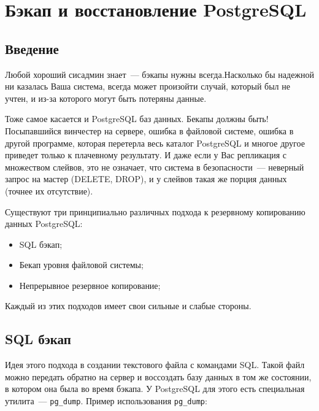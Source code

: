 \chapter{Бэкап и восстановление PostgreSQL}

\begin{epigraphs}
\end{epigraphs}

\section{Введение}

Любой хороший сисадмин знает~--- бэкапы нужны всегда.Насколько бы надежной ни казалась Ваша система, всегда может произойти случай, который был не учтен, и из-за которого могут быть потеряны данные.

Тоже самое касается и PostgreSQL баз данных. Бекапы должны быть! Посыпавшийся винчестер на сервере, ошибка в файловой системе, ошибка в другой программе, которая перетерла весь каталог PostgreSQL и многое другое приведет только к плачевному результату. И даже если у Вас репликация с множеством слейвов, это не означает, что система в безопасности~--- неверный запрос на мастер (DELETE, DROP), и у слейвов такая же порция данных (точнее их отсутствие).

Существуют три принципиально различных подхода к резервному копированию данных PostgreSQL:

\begin{itemize}
  \item SQL бэкап;
  \item Бекап уровня файловой системы;
  \item Непрерывное резервное копирование;
\end{itemize}

Каждый из этих подходов имеет свои сильные и слабые стороны.


\section{SQL бэкап}

Идея этого подхода в создании текстового файла с командами SQL. Такой файл можно передать обратно на сервер и воссоздать базу данных в том же состоянии, в котором она была во время бэкапа. У PostgreSQL для этого есть специальная утилита~--- \lstinline!pg_dump!. Пример использования \lstinline!pg_dump!:

